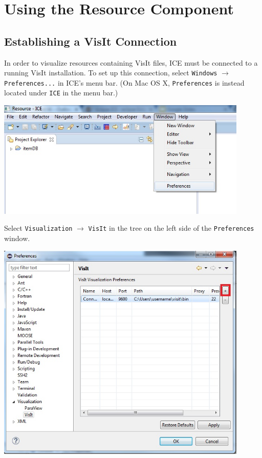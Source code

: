 \section{Using the Resource Component}

\subsection{Establishing a VisIt Connection}

In order to visualize resources containing VisIt files, ICE must be connected to
a running VisIt installation. To set up this connection, select \texttt{Windows}
$\rightarrow$ \texttt{Preferences...} in ICE's menu bar. (On Mac OS X,
\texttt{Preferences} is instead located under \texttt{ICE} in the menu
bar.)

\begin{center}
\includegraphics[width=12cm]{images/ICEPreferences}
\end{center}

Select \texttt{Visualization} $\rightarrow$ \texttt{VisIt} in the tree on the
left side of the \texttt{Preferences} window.

\begin{center}
\includegraphics[width=12cm]{images/VisualizationPreferences}
\end{center}


